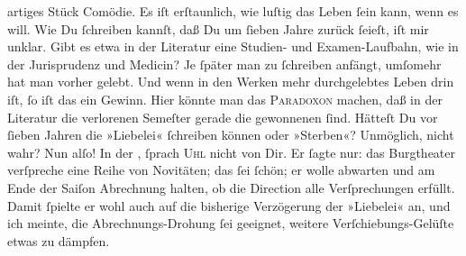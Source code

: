 \begin{ledgroupsized}[t]{13cm}
               artiges Stück Comödie. Es iſt erſtaunlich, wie luſtig das Leben ſein kann, wenn {\pb}es will.\pend
           \pstart
           Wie Du ſchreiben kannſt, daß Du um ſieben Jahre zurück ſeieſt, iſt mir unklar. Gibt
               es etwa in der Literatur eine Studien- und Examen-Laufbahn, wie in der Jurisprudenz
               und Medicin? Je ſpäter man zu ſchreiben anfängt, umſomehr hat man vorher gelebt. Und
               wenn in den Werken mehr durchgelebtes Leben drin iſt, ſo iſt das ein Gewinn. Hier
               könnte man das \textsc{Paradoxon} machen, daß in der Literatur die
               verlorenen Semeſter gerade die gewonnenen ſind. Hätteſt Du vor ſieben Jahren {\pb}die »Liebelei«
               ſchreiben können oder »Sterben«? Unmöglich,
               nicht wahr? Nun alſo!\pend
           \pstart
           In der \label{K_L02748-99v}\label{K_L02748-99h}, ſprach \textsc{Uhl} nicht von Dir. Er ſagte nur: das Burgtheater verſpreche eine Reihe von Novitäten; das ſei ſchön; er wolle
               abwarten und am Ende der Saiſon Abrechnung halten, ob die Direction alle Verſprechungen erfüllt.
               Damit ſpielte er wohl auch auf die bisherige Verzögerung der »Liebelei« an, und ich meinte, {\pb}die Abrechnungs-Drohung ſei geeignet, weitere
               Verſchiebungs-Gelüſte etwas zu dämpfen.\pend

\end{ledgroupsized}
